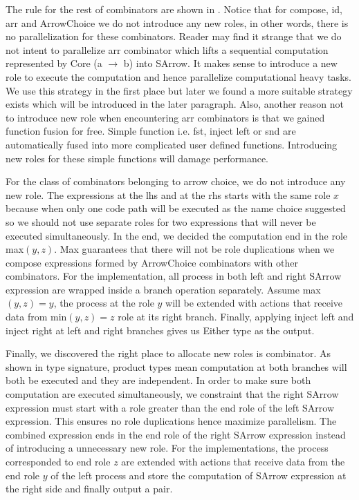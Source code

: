 The rule for the rest of combinators are shown in . Notice that for compose, id, arr and ArrowChoice we do not introduce any new roles, in other words, there is no parallelization for these combinators. Reader may find it strange that we do not intent to parallelize arr combinator which lifts a sequential computation represented by Core (a $\rightarrow$ b) into SArrow. It makes sense to introduce a new role to execute the computation and hence parallelize computational heavy tasks. We use this strategy in the first place but later we found a more suitable strategy exists which will be introduced in the later paragraph. Also, another reason not to introduce new role when encountering arr combinators is that we gained function fusion for free. Simple function i.e. fst, inject left or snd are automatically fused into more complicated user defined functions. Introducing new roles for these simple functions will damage performance. %

For the class of combinators belonging to arrow choice, we do not introduce any new role. The expressions at the lhs and at the rhs starts with the same role $x$ because when only one code path will be executed as the name choice suggested so we should not use separate roles for two expressions that will never be executed simultaneously. In the end, we decided the computation end in the role max$(y,z)$. Max guarantees that there will not be role duplications when we compose expressions formed by ArrowChoice combinators with other combinators. For the implementation, all process in both left and right SArrow expression are wrapped inside a branch operation separately. Assume max$(y, z) = y$, the process at the role $y$ will be extended with actions that receive data from min$(y, z) = z$ role at its right branch. Finally, applying inject left and inject right at left and right branches gives us Either type as the output.

Finally, we discovered the right place to allocate new roles is \hask{&&&} combinator. As shown in type signature, product types mean computation at both branches will both be executed and they are independent. In order to make sure both computation are executed simultaneously, we constraint that the right SArrow expression must start with a role greater than the end role of the left SArrow expression. This ensures no role duplications hence maximize parallelism. The combined expression ends in the end role of the right SArrow expression instead of introducing a unnecessary new role. For the implementations, the process corresponded to end role $z$ are extended with actions that receive data from the end role $y$ of the left process and store the computation of SArrow expression at the right side and finally output a pair.

